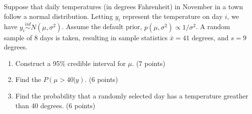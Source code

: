   \item 
Suppose that daily temperatures (in degrees Fahrenheit) in November in a town follow a normal distribution. Letting $y_i$ represent the temperature on day $i$, we have $y_i\stackrel{iid}{\sim}N(\mu, \sigma^2)$. Assume the default prior, $p(\mu, \sigma^2)\propto 1/\sigma^2$. A random sample of 8 days is taken, resulting in sample statistics $\bar{x}=41$ degrees, and $s=9$ degrees. 
 
     
    \begin{enumerate}
      \item Construct a 95\% credible interval for $\mu$.  (7 points)
      
    
    \vfill
      \item Find the $P(\mu>40|y)$. (6 points)
      
         \vfill  
         
     \item Find the probability that a randomly selected day has a temperature greather than 40 degrees. (6 points) \\
   
     
\end{enumerate}
\vfill